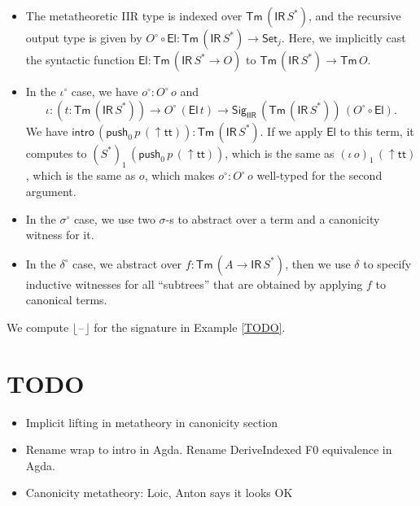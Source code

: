 \documentclass[acmsmall,screen,review,anonymous]{acmart}
\newcommand{\msf}[1]{{\mathsf{#1}}}
\newcommand{\push}{\mathsf{push}}
\newcommand{\Set}{\msf{Set}}
\newcommand{\El}{\msf{El}}
\newcommand{\lup}{\uparrow}
\newcommand{\Sig}{\msf{Sig}}
\newcommand{\ttt}{\msf{tt}}
\newcommand{\blank}{{\mathord{\hspace{1pt}\text{--}\hspace{1pt}}}}
\newcommand{\IR}{\msf{IR}}
\newcommand{\intro}{\msf{intro}}
\newcommand{\IIR}{\msf{IIR}}
\newcommand{\floord}[1]{\lfloor #1 \rfloor}
\newcommand{\Tm}{\msf{Tm}}
\newcommand{\w}{\circ}
\begin{document}
\begin{itemize}
  \item The metatheoretic IIR type is indexed over $\Tm\,(\IR\,S^*)$, and the recursive output type
    is given by $O^\w\circ \El : \Tm\,(\IR\,S^*) \to \Set_j$. Here, we implicitly cast the syntactic
    function $\El : \Tm\,(\IR\,S^* \to O)$ to $\Tm\,(\IR\,S^*) \to \Tm\,O$.
  \item In the $\iota^\w$ case, we have $o^\w : O^\w\,o$ and
    \[ \iota : (t : \Tm\,(\IR\,S^*)) \to O^\w\,(\El\,t) \to \Sig_\IIR\,(\Tm\,(\IR\,S^*))\,(O^\w\circ \El). \]
    We have $\intro\,(\push_0\,p\,(\lup\!\ttt)) : \Tm\,(\IR\,S^*)$. If we apply $\El$ to this term, it computes
    to $(S^*)_1\,(\push_0\,p\,(\lup\!\ttt))$, which is the same as $(\iota\,o)_1\,(\lup\!\ttt)$, which is the same
    as $o$, which makes $o^\w : O^\w\,o$ well-typed for the second argument.
  \item In the $\sigma^\w$ case, we use two $\sigma$-s to abstract over a term and a canonicity witness for it.
  \item In the $\delta^\w$ case, we abstract over $f : \Tm\,(A \to \IR\,S^*)$, then we use $\delta$ to specify inductive
        witnesses for all ``subtrees'' that are obtained by applying $f$ to canonical terms.
\end{itemize}

\begin{example} We compute $\floord{\blank}$ for the signature in Example \ref{TODO}.



\end{example}

\section{TODO}


\begin{itemize}
  \item Implicit lifting in metatheory in canonicity section
  \item Rename wrap to intro in Agda. Rename DeriveIndexed F0 equivalence in Agda.
  \item Canonicity metatheory: Loic, Anton says it looks OK

\end{itemize}



\end{document}
